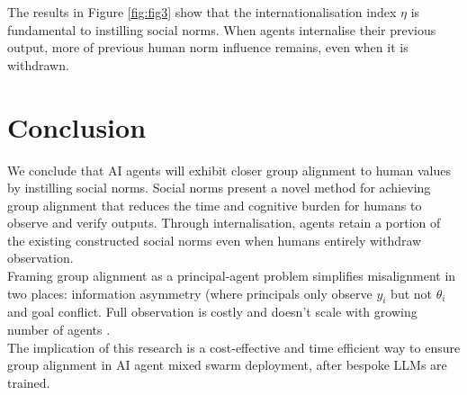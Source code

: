 \documentclass{article}
\begin{document}
The results in Figure \ref{fig:fig3} show that the internationalisation index $\eta$ is fundamental to instilling social norms. When agents internalise their previous output, more of previous human norm influence remains, even when it is withdrawn.


\section{Conclusion}

We conclude that AI agents will exhibit closer group alignment to human values by instilling social norms. Social norms present a novel method for achieving group alignment that reduces the time and cognitive burden for humans to observe and verify outputs. Through internalisation, agents retain a portion of the existing constructed social norms even when humans entirely withdraw observation. \\

Framing group alignment as a principal-agent problem simplifies misalignment in two places: information asymmetry (where principals only observe $y_i$ but not $\theta_i$ and goal conflict. Full observation is costly and doesn't scale with growing number of agents \citep{rauba2026,kwa2025}. \\


The implication of this research is a cost-effective and time efficient way to ensure group alignment in AI agent mixed swarm deployment, after bespoke LLMs are trained. 
\end{document}
